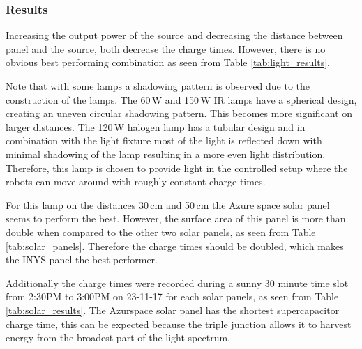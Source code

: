\subsubsection{Results}

Increasing the output power of the source and decreasing the distance between panel and the source, both decrease the charge times.
However, there is no obvious best performing combination as seen from Table \ref{tab:light_results}.

Note that with some lamps a shadowing pattern is observed due to the construction of the lamps.
The 60\,W and 150\,W IR lamps have a spherical design, creating an uneven circular shadowing pattern. 
This becomes more significant on larger distances.
The 120\,W halogen lamp has a tubular design and in combination with the light fixture most of the light is reflected down with minimal shadowing of the lamp resulting in a more even light distribution.
Therefore, this lamp is chosen to provide light in the controlled setup where the robots can move around with roughly constant charge times.

For this lamp on the distances 30\,cm and 50\,cm the Azure space solar panel seems to perform the best.
However, the surface area of this panel is more than double when compared to the other two solar panels, as seen from Table \ref{tab:solar_panels}.
Therefore the charge times should be doubled, which makes the INYS panel the best performer.

Additionally the charge times were recorded during a sunny 30 minute time slot from 2:30PM to 3:00PM on 23-11-17 for each solar panels, as seen from Table \ref{tab:solar_results}.
The Azurspace solar panel has the shortest supercapacitor charge time, this can be expected because the triple junction allows it to harvest energy from the broadest part of the light spectrum.


